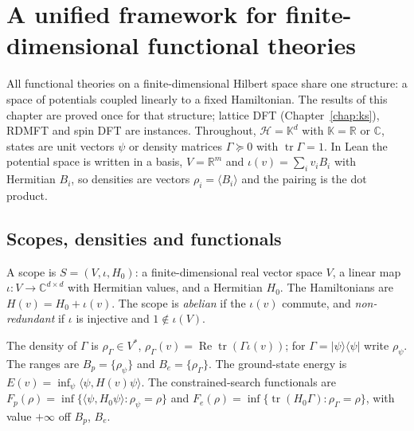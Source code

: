 \chapter{A unified framework for finite-dimensional functional theories}
\label{chap:unified}


All functional theories on a finite-dimensional Hilbert space share one structure: a space of potentials coupled
linearly to a fixed Hamiltonian. The results of this chapter are proved once for that structure; lattice DFT
(Chapter~\ref{chap:ks}), RDMFT and spin DFT are instances. Throughout, $\mathcal H=\mathbb K^d$ with $\mathbb K=\mathbb R$ or $\mathbb C$, states are unit
vectors $\psi$ or density matrices $\Gamma\succeq0$ with $\operatorname{tr}\Gamma=1$. In Lean the potential space is written in a
basis, $V=\mathbb R^m$ and $\iota(v)=\sum_iv_iB_i$ with Hermitian $B_i$, so densities are vectors $\rho_i=\langle B_i\rangle$ and the
pairing is the dot product.

\section{Scopes, densities and functionals}

\begin{definition}[Scope]\label{def:scope}
  \leanok
  A scope is $S=(V,\iota,H_0)$: a finite-dimensional real vector space $V$, a linear map $\iota:V\to\mathbb C^{d\times d}$ with
  Hermitian values, and a Hermitian $H_0$. The Hamiltonians are $H(v)=H_0+\iota(v)$. The scope is \emph{abelian} if the
  $\iota(v)$ commute, and \emph{non-redundant} if $\iota$ is injective and $1\notin\iota(V)$.
\end{definition}

\begin{definition}\label{def:scope-functionals}
  \leanok
  The density of $\Gamma$ is $\rho_\Gamma\in V^*$, $\rho_\Gamma(v)=\operatorname{Re}\operatorname{tr}(\Gamma\iota(v))$; for $\Gamma=|\psi\rangle\langle\psi|$ write
  $\rho_\psi$. The ranges are $B_p=\{\rho_\psi\}$ and $B_e=\{\rho_\Gamma\}$. The ground-state energy is
  $E(v)=\inf_\psi\langle\psi,H(v)\psi\rangle$. The constrained-search functionals are
  $F_p(\rho)=\inf\{\langle\psi,H_0\psi\rangle:\rho_\psi=\rho\}$ and $F_e(\rho)=\inf\{\operatorname{tr}(H_0\Gamma):\rho_\Gamma=\rho\}$, with value $+\infty$
  off $B_p$, $B_e$.
\end{definition}

